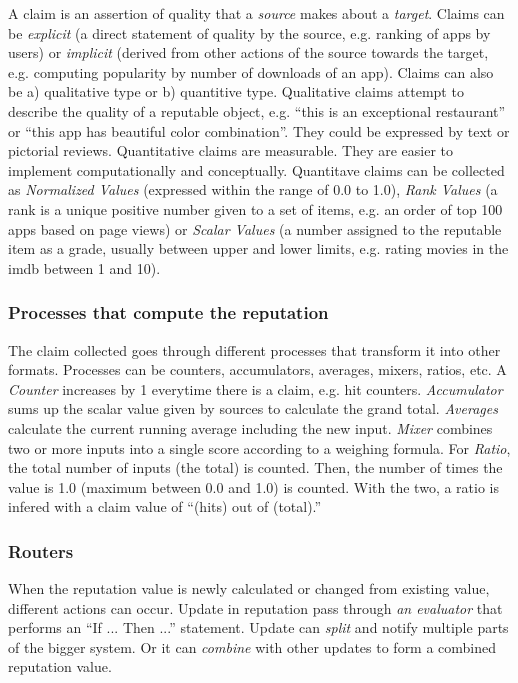 A claim is an assertion of quality that a \textit{source} makes about a \textit{target}. Claims can be \textit{explicit} (a direct statement of quality by the source, e.g. ranking of apps by users) or \textit{implicit} (derived from other actions of the source towards the target, e.g. computing popularity by number of downloads of an app). Claims can also be a) qualitative type or b) quantitive type. Qualitative claims attempt to describe the quality of a reputable object, e.g. ``this is an exceptional restaurant'' or ``this app has beautiful color combination''. They could be expressed by text or pictorial reviews. Quantitative claims are measurable. They are easier to implement computationally and conceptually. Quantitave claims can be collected as \textit{Normalized Values} (expressed within the range of 0.0 to 1.0), \textit{Rank Values} (a rank is a unique positive number given to a set of items, e.g. an order of top 100 apps based on page views) or \textit{Scalar Values} (a number assigned to the reputable item as a grade, usually between upper and lower limits, e.g. rating movies in the imdb between 1 and 10).

\subsubsection{Processes that compute the reputation}

The claim collected goes through different processes that transform it into other formats. Processes can be counters, accumulators, averages, mixers,  ratios, etc. A \textit{Counter} increases by 1 everytime there is a claim, e.g. hit counters. \textit{Accumulator} sums up the scalar value given by sources to calculate the grand total. \textit{Averages} calculate the current running average including the new input. \textit{Mixer} combines two or more inputs into a single score according to a weighing formula. For \textit{Ratio}, the total number of inputs (the total) is counted. Then, the number of times the value is 1.0 (maximum between 0.0 and 1.0) is counted. With the two, a ratio is infered with a claim value of ``(hits) out of (total).''

\subsubsection{Routers}

When the reputation value is newly calculated or changed from existing value, different actions can occur. Update in reputation pass through \textit{an evaluator} that performs an ``If ... Then ...'' statement. Update can \textit{split} and notify multiple parts of the bigger system. Or it can \textit{combine} with other updates to form a combined reputation value.

